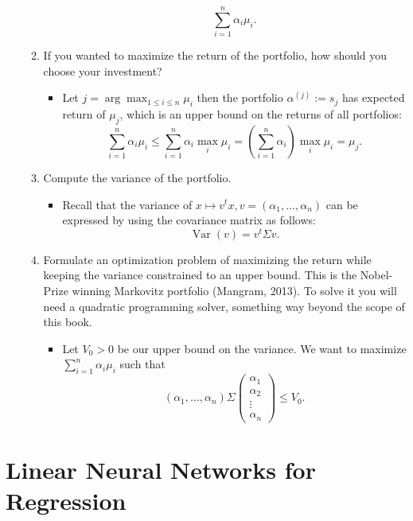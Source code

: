 \documentclass{article}
\begin{document}
\begin{enumerate}
\begin{enumerate}
\begin{itemize}
					$$
					\sum_{i = 1}^n \alpha_i \mu_i.
					$$
				\end{itemize}
			\item If you wanted to maximize the return of the portfolio, how should you choose your investment?
				\begin{itemize}
					\item Let $j = \operatorname{arg} \max_{1 \leq i \leq n} \mu_i$ then the portfolio $\alpha^{(j)} := s_j$ has expected return of $\mu_j$, which is an upper bound on the returns of all portfolios:
					$$
					\sum_{i = 1}^n \alpha_i \mu_i \leq \sum_{i = 1}^n \alpha_i \max_i \mu_i = \left(\sum_{i = 1}^n \alpha_i\right) \max_i \mu_i = \mu_j.
					$$
				\end{itemize}
			\item Compute the variance of the portfolio.
				\begin{itemize}
					\item Recall that the variance of $x \mapsto v^t x, v = (\alpha_1, \dots, \alpha_n)$ can be expressed by using the covariance matrix as follows:
					$$
					\operatorname{Var}(v) = v^t \Sigma v.
					$$
				\end{itemize}
			\item Formulate an optimization problem of maximizing the return while keeping the variance constrained to an upper bound. This is the Nobel-Prize winning Markovitz portfolio (Mangram, 2013). To solve it you will need a quadratic programming solver, something way beyond the scope of this book.
				\begin{itemize}
					\item Let $V_0 > 0$ be our upper bound on the variance. We want to maximize $\sum_{i = 1}^n \alpha_i \mu_i$ such that
					$$
					(\alpha_1, \dots, \alpha_n) \Sigma \begin{pmatrix} \alpha_1 \\ \alpha_2 \\ \vdots \\ \alpha_n \end{pmatrix} \leq V_0.
					$$
				\end{itemize}
		\end{enumerate}
\end{enumerate}

\newpage
\section{Linear Neural Networks for Regression}
\end{document}
